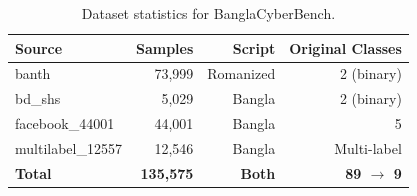 \begin{table}[t]
\centering
\caption{Dataset statistics for BanglaCyberBench.}
\label{tab:dataset}
\begin{tabular}{lrrr}
\toprule
\textbf{Source} & \textbf{Samples} & \textbf{Script} & \textbf{Original Classes} \\
\midrule
banth              & 73,999  & Romanized & 2 (binary) \\
bd\_shs            & 5,029   & Bangla    & 2 (binary) \\
facebook\_44001    & 44,001  & Bangla    & 5 \\
multilabel\_12557  & 12,546  & Bangla    & Multi-label \\
\midrule
\textbf{Total}     & \textbf{135,575} & \textbf{Both} & \textbf{89 $\rightarrow$ 9} \\
\bottomrule
\end{tabular}
\end{table}
